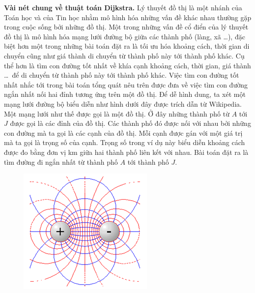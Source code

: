 \begin{multicols}{2}
	\textbf{\color{quantoan}Vài nét chung về thuật toán Dijkstra.}
	\vskip 0.1cm
	Lý thuyết đồ thị là một nhánh của Toán học và của Tin học nhằm mô hình hóa những vấn đề khác nhau thường gặp trong cuộc sống bởi những đồ thị. Một trong những vấn đề cổ điển của lý thuyết đồ thị là mô hình hóa mạng lưới đường bộ giữa các thành phố (làng, xã \ldots), đặc biệt hơn một trong những bài toán đặt ra là tối ưu hóa khoảng cách, thời gian di chuyển cũng như giá thành di chuyển từ thành phố này tới thành phố khác. Cụ thể hơn là tìm con đường tốt nhất về khía cạnh khoảng cách, thời gian, giá thành \!\ldots\,\! để di chuyển từ thành phố này tới thành phố khác. Việc tìm con đường tốt nhất nhắc tới trong bài toán tổng quát nêu trên được đưa về việc tìm con đường ngắn nhất nối hai đỉnh tương ứng trên một đồ thị.
	\vskip 0.1cm 
	Để dễ hình dung, ta xét một mạng lưới đường bộ biểu diễn như hình dưới đây được trích dẫn từ Wikipedia.
	\vskip 0.1cm
	Một mạng lưới như thế được gọi là một đồ thị. Ở đây những thành phố từ $A$ tới $J$ được gọi là các đỉnh của đồ thị. Các thành phố đó được nối với nhau bởi những con đường mà ta gọi là các cạnh của đồ thị. Mỗi cạnh được gán với một giá trị mà ta gọi là trọng số của cạnh. Trọng số trong ví dụ này biểu diễn khoảng cách được đo bằng đơn vị km giữa hai thành phố liên kết với nhau. Bài toán đặt ra là tìm đường đi ngắn nhất từ thành phố $A$ tới thành phố $J$. 
	\begin{figure}[H]
		\vspace*{-5pt}
		\centering
		\captionsetup{labelformat= empty, justification=centering}
		\includegraphics[width= 0.9\linewidth]{1}

\end{figure}
\end{multicols}
